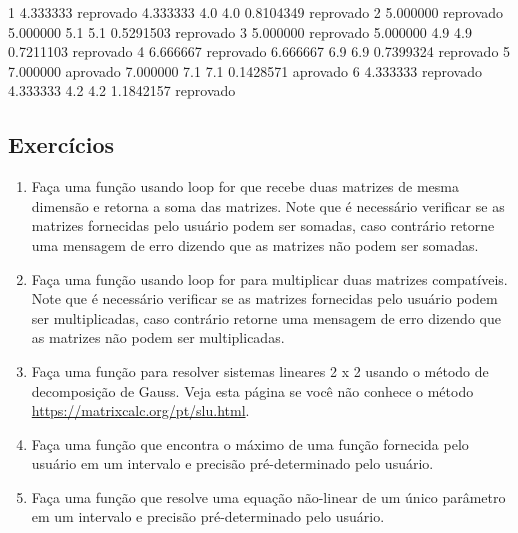 \documentclass[10pt,a4paper]{book}
\newenvironment{Shaded}{\begin{snugshade}}{\end{snugshade}}
\newcommand{\DecValTok}[1]{\textcolor[rgb]{0.00,0.00,0.81}{#1}}
\newcommand{\FloatTok}[1]{\textcolor[rgb]{0.00,0.00,0.81}{#1}}
\newcommand{\NormalTok}[1]{#1}
\providecommand{\tightlist}{%
  \setlength{\itemsep}{0pt}\setlength{\parskip}{0pt}}
\begin{document}
\begin{Shaded}
\begin{Highlighting}[]
\DecValTok{1} \FloatTok{4.333333}\NormalTok{ reprovado    }\FloatTok{4.333333}      \FloatTok{4.0}       \FloatTok{4.0} \FloatTok{0.8104349}\NormalTok{ reprovado}
\DecValTok{2} \FloatTok{5.000000}\NormalTok{ reprovado    }\FloatTok{5.000000}      \FloatTok{5.1}       \FloatTok{5.1} \FloatTok{0.5291503}\NormalTok{ reprovado}
\DecValTok{3} \FloatTok{5.000000}\NormalTok{ reprovado    }\FloatTok{5.000000}      \FloatTok{4.9}       \FloatTok{4.9} \FloatTok{0.7211103}\NormalTok{ reprovado}
\DecValTok{4} \FloatTok{6.666667}\NormalTok{ reprovado    }\FloatTok{6.666667}      \FloatTok{6.9}       \FloatTok{6.9} \FloatTok{0.7399324}\NormalTok{ reprovado}
\DecValTok{5} \FloatTok{7.000000}\NormalTok{  aprovado    }\FloatTok{7.000000}      \FloatTok{7.1}       \FloatTok{7.1} \FloatTok{0.1428571}\NormalTok{  aprovado}
\DecValTok{6} \FloatTok{4.333333}\NormalTok{ reprovado    }\FloatTok{4.333333}      \FloatTok{4.2}       \FloatTok{4.2} \FloatTok{1.1842157}\NormalTok{ reprovado}
\end{Highlighting}
\end{Shaded}

\subsection*{Exercícios}\label{exercuxedcios-13}


\begin{enumerate}
\def\labelenumi{\arabic{enumi}.}
\tightlist
\item
  Faça uma função usando loop for que recebe duas matrizes de mesma
  dimensão e retorna a soma das matrizes. Note que é necessário
  verificar se as matrizes fornecidas pelo usuário podem ser somadas,
  caso contrário retorne uma mensagem de erro dizendo que as matrizes
  não podem ser somadas.
\item
  Faça uma função usando loop for para multiplicar duas matrizes
  compatíveis. Note que é necessário verificar se as matrizes fornecidas
  pelo usuário podem ser multiplicadas, caso contrário retorne uma
  mensagem de erro dizendo que as matrizes não podem ser multiplicadas.
\item
  Faça uma função para resolver sistemas lineares 2 x 2 usando o método
  de decomposição de Gauss. Veja esta página se você não conhece o
  método \url{https://matrixcalc.org/pt/slu.html}.
\item
  Faça uma função que encontra o máximo de uma função fornecida pelo
  usuário em um intervalo e precisão pré-determinado pelo usuário.
\item
  Faça uma função que resolve uma equação não-linear de um único
  parâmetro em um intervalo e precisão pré-determinado pelo usuário.
\end{enumerate}
\end{document}
